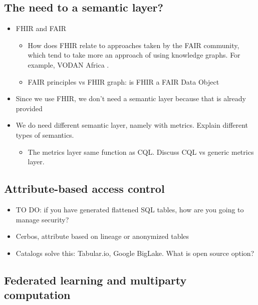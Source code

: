 \documentclass[
  authoryear]{elsarticle}
\providecommand{\tightlist}{%
  \setlength{\itemsep}{0pt}\setlength{\parskip}{0pt}}\usepackage{longtable,booktabs,array}
\begin{document}
\subsection{The need to a semantic
layer?}\label{the-need-to-a-semantic-layer}

\begin{itemize}
\tightlist
\item
  FHIR and FAIR

  \begin{itemize}
  \tightlist
  \item
    How does FHIR relate to approaches taken by the FAIR community,
    which tend to take more an approach of using knowledge graphs. For
    example, VODAN Africa
    \citep{gebreslassie2023fhir4fair, purnamajati2022data}.
  \item
    FAIR principles vs FHIR graph: is FHIR a FAIR Data Object
  \end{itemize}
\item
  Since we use FHIR, we don't need a semantic layer because that is
  already provided
\item
  We do need different semantic layer, namely with metrics. Explain
  different types of semantics.

  \begin{itemize}
  \tightlist
  \item
    The metrics layer same function as CQL. Discuss CQL vs generic
    metrics layer.
  \end{itemize}
\end{itemize}

\subsection{Attribute-based access
control}\label{attribute-based-access-control}

\begin{itemize}
\tightlist
\item
  TO DO: if you have generated flattened SQL tables, how are you going
  to manage security?
\item
  Cerbos, attribute based on lineage or anonymized tables
\item
  Catalogs solve this: Tabular.io, Google BigLake. What is open source
  option?
\end{itemize}

\subsection{Federated learning and multiparty
computation}\label{federated-learning-and-multiparty-computation}
\end{document}
